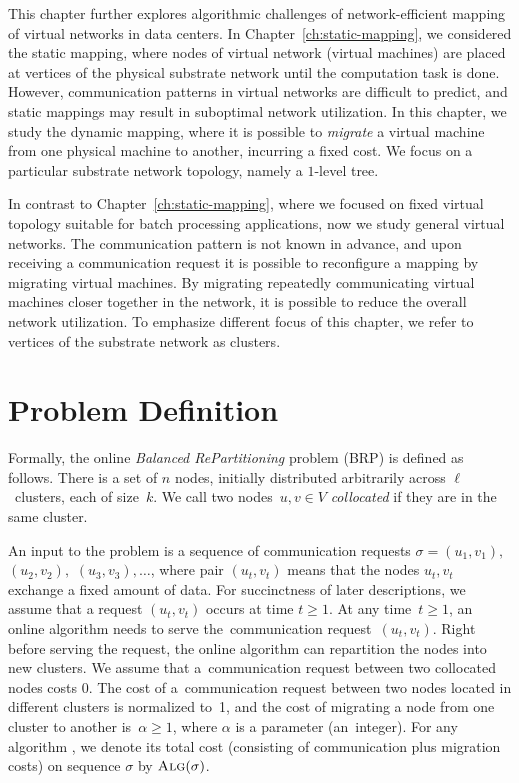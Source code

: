 This chapter further explores algorithmic challenges of network-efficient mapping of virtual networks in data centers.
In Chapter~\ref{ch:static-mapping}, we considered the static mapping, where nodes of virtual network (virtual machines) are placed at vertices of the physical substrate network until the computation task is done.
However, communication patterns in virtual networks are difficult to predict, and static mappings may result in suboptimal network utilization.
In this chapter, we study the dynamic mapping, where it is possible to \emph{migrate} a virtual machine from one physical machine to another, incurring a fixed cost.
We focus on a particular substrate network topology, namely a $1$-level tree.

In contrast to Chapter~\ref{ch:static-mapping}, where we focused on fixed virtual topology suitable for batch processing applications, now we study general virtual networks.
The communication pattern is not known in advance, and upon receiving a communication request it is possible to reconfigure a mapping by migrating virtual machines.
By migrating repeatedly communicating virtual machines closer together in the network, it is possible to reduce the overall network utilization.
To emphasize different focus of this chapter, we refer to vertices of the substrate network as clusters.

\section{Problem Definition}


Formally, the online \emph{Balanced RePartitioning} problem (BRP) is defined as
follows. There is a set of $n$ nodes, initially distributed arbitrarily
across $\ell$~clusters, each of size~$k$. We call two nodes~$u,v\in V$
\emph{collocated} if they are in the same cluster.

An input to the problem is a sequence of communication requests $\sigma =
(u_1,v_1),$ $(u_2,v_2),$ $(u_3,v_3), \ldots$, where pair $(u_t,v_t)$ means that
the nodes $u_t,v_t$ exchange a fixed amount of data. For succinctness of later descriptions,
we assume that a request $(u_t,v_t)$ occurs at time $t \geq 1$. At any time~$t
\geq 1$, an online algorithm needs to serve the~communication
request~$(u_t,v_t)$. Right before serving the request, the online algorithm
can repartition the nodes into new clusters. We assume that
a~communication request between two collocated nodes costs 0. The cost of a~communication request between two nodes located in different clusters is
normalized to~1, and the cost of migrating a node from one cluster to another
is~$\alpha \geq 1$, where $\alpha$ is a parameter (an~integer). For any
algorithm \ALG, we denote its total cost (consisting of communication plus
migration costs) on sequence $\sigma$ by $\textsc{Alg}(\sigma)$.


